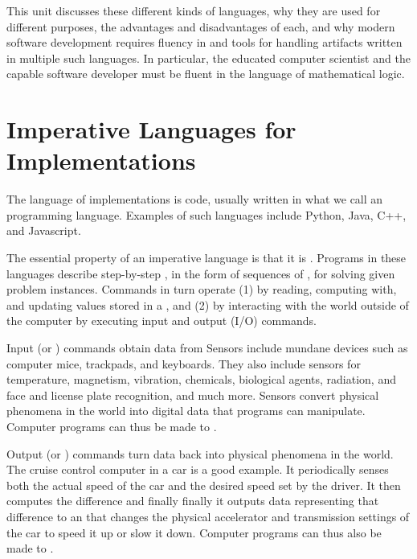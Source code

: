 \documentclass[letterpaper,10pt,english]{sphinxmanual}
\begin{document}
This unit discusses these different kinds of languages, why they are
used for different purposes, the advantages and disadvantages of each,
and why modern software development requires fluency in and tools for
handling artifacts written in multiple such languages. In particular,
the educated computer scientist and the capable software developer
must be fluent in the language of mathematical logic.


\section{Imperative Languages for Implementations}
\label{\detokenize{02-logic-and-code:imperative-languages-for-implementations}}
The language of implementations is code, usually written in what we
call an  programming language. Examples of such languages
include Python, Java, C++, and Javascript.

The essential property of an imperative language is that it is
. Programs in these languages describe step-by-step
, in the form of sequences of , for solving
given problem instances. Commands in turn operate (1) by reading,
computing with, and updating values stored in a , and (2) by
interacting with the world outside of the computer by executing input
and output (I/O) commands.

Input (or ) commands obtain data from  Sensors include
mundane devices such as computer mice, trackpads, and keyboards. They
also include sensors for temperature, magnetism, vibration, chemicals,
biological agents, radiation, and face and license plate recognition,
and much more. Sensors convert physical phenomena in the world into
digital data that programs can manipulate. Computer programs can thus be
made to .

Output (or ) commands turn data back into physical phenomena in
the world. The cruise control computer in a car is a good example.  It
periodically senses both the actual speed of the car and the desired
speed set by the driver. It then computes the difference and finally
finally it outputs data representing that difference to an 
that changes the physical accelerator and transmission settings of the
car to speed it up or slow it down. Computer programs can thus also be
made to .
\end{document}
